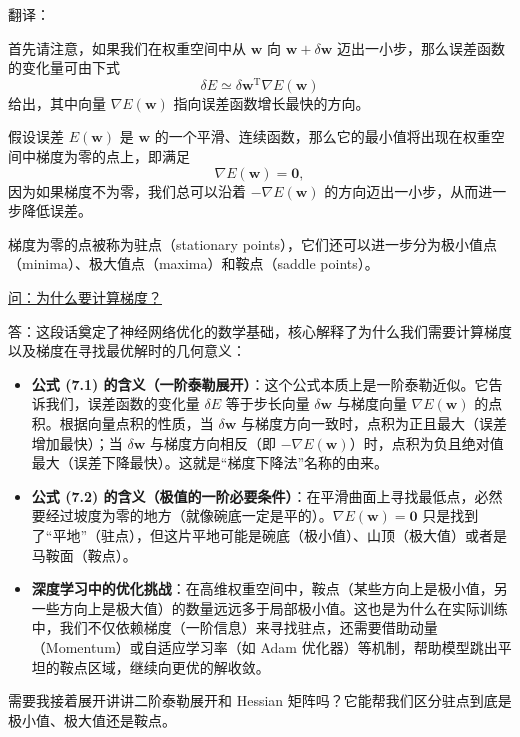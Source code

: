 \documentclass{article}
\begin{document}
{\color{red}
翻译：

首先请注意，如果我们在权重空间中从 $\mathbf{w}$ 向 $\mathbf{w} + \delta\mathbf{w}$ 迈出一小步，那么误差函数的变化量可由下式
\begin{equation}
\delta E \simeq \delta\mathbf{w}^\mathrm{T} \nabla E(\mathbf{w})
\tag{7.1}
\end{equation}
给出，其中向量 $\nabla E(\mathbf{w})$ 指向误差函数增长最快的方向。

假设误差 $E(\mathbf{w})$ 是 $\mathbf{w}$ 的一个平滑、连续函数，那么它的最小值将出现在权重空间中梯度为零的点上，即满足
\begin{equation}
\nabla E(\mathbf{w}) = \mathbf{0},
\tag{7.2}
\end{equation}
因为如果梯度不为零，我们总可以沿着 $-\nabla E(\mathbf{w})$ 的方向迈出一小步，从而进一步降低误差。

梯度为零的点被称为驻点（stationary points），它们还可以进一步分为极小值点（minima）、极大值点（maxima）和鞍点（saddle points）。
}

{\color{blue}
\underline{问：为什么要计算梯度？}

答：这段话奠定了神经网络优化的数学基础，核心解释了为什么我们需要计算梯度以及梯度在寻找最优解时的几何意义：

\begin{itemize}

\item \textbf{公式 (7.1) 的含义（一阶泰勒展开）}：这个公式本质上是一阶泰勒近似。它告诉我们，误差函数的变化量 $\delta E$ 等于步长向量 $\delta\mathbf{w}$ 与梯度向量 $\nabla E(\mathbf{w})$ 的点积。根据向量点积的性质，当 $\delta\mathbf{w}$ 与梯度方向一致时，点积为正且最大（误差增加最快）；当 $\delta\mathbf{w}$ 与梯度方向相反（即 $-\nabla E(\mathbf{w})$）时，点积为负且绝对值最大（误差下降最快）。这就是“梯度下降法”名称的由来。
    
\item \textbf{公式 (7.2) 的含义（极值的一阶必要条件）}：在平滑曲面上寻找最低点，必然要经过坡度为零的地方（就像碗底一定是平的）。$\nabla E(\mathbf{w}) = \mathbf{0}$ 只是找到了“平地”（驻点），但这片平地可能是碗底（极小值）、山顶（极大值）或者是马鞍面（鞍点）。
    
\item \textbf{深度学习中的优化挑战}：在高维权重空间中，鞍点（某些方向上是极小值，另一些方向上是极大值）的数量远远多于局部极小值。这也是为什么在实际训练中，我们不仅依赖梯度（一阶信息）来寻找驻点，还需要借助动量（Momentum）或自适应学习率（如 Adam 优化器）等机制，帮助模型跳出平坦的鞍点区域，继续向更优的解收敛。
\end{itemize}

需要我接着展开讲讲二阶泰勒展开和 Hessian 矩阵吗？它能帮我们区分驻点到底是极小值、极大值还是鞍点。
}
\end{document}
